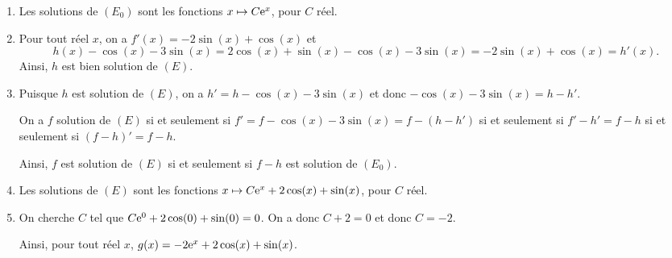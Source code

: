 \documentclass[11pt,fleqn, openany]{book} %
\begin{document}
\begin{solution}\hspace{0pt}

\begin{enumerate}
\item Les solutions de $(E_0)$ sont les fonctions $x\mapsto C\mathrm{e}^x$, pour $C$ réel.
\item Pour tout réel $x$, on a $f'(x)=-2\sin(x)+\cos(x)$ et \[h(x)-\cos(x)-3\sin(x)=2\cos(x)+\sin(x)-\cos(x)-3\sin(x)=-2\sin(x)+\cos(x)=h'(x).\] Ainsi, $h$ est bien solution de $(E)$.
\item Puisque $h$ est solution de $(E)$, on a $h'=h-\cos(x)-3\sin(x)$ et donc $-\cos(x)-3\sin(x)=h-h'$.

On a $f$ solution de $(E)$ si et seulement si $f'=f-\cos(x)-3\sin(x)=f-(h-h')$ si et seulement si $f'-h'=f-h$ si et seulement si $(f-h)'=f-h$.

 Ainsi, $f$ est solution de $(E)$ si et seulement si $f-h$ est solution de $(E_0)$.
\item Les solutions de $(E)$ sont les fonctions $x\mapsto C\mathrm{e}^x+2\cos(x)+\sin(x)$, pour $C$ réel.
\item On cherche $C$ tel que $C\mathrm{e}^0+2\cos(0)+\sin(0)=0$. On a donc $C+2=0$ et donc $C=-2$. 

Ainsi, pour tout réel $x$, $g(x)=-2\mathrm{e}^x+2\cos(x)+\sin(x)$.
\end{enumerate}

\end{solution}
\end{document}
